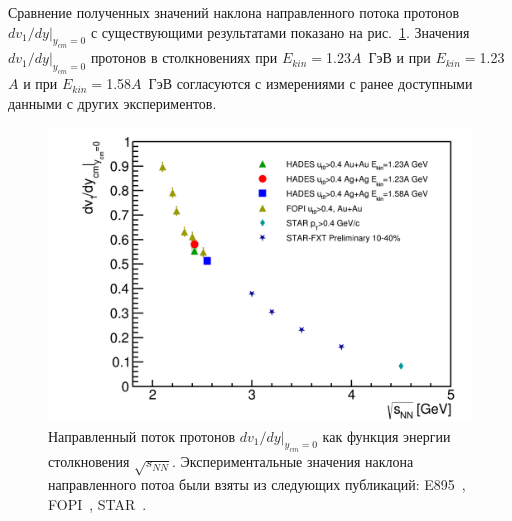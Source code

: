 Сравнение полученных значений наклона направленного потока протонов $dv_1/dy|_{y_{cm}=0}$ с существующими результатами показано на рис.~\ref{fig:hades_dv1_dy_sqrt_snn}.
Значения $dv_1/dy|_{y_{cm}=0}$ протонов в столкновениях \au{} при $E_{kin}=$1.23$A$~ГэВ и \ag{} при $E_{kin}=$1.23$A$ и  при $E_{kin}=$1.58$A$~ГэВ согласуются с измерениями с ранее доступными данными с других экспериментов.
%
\begin{figure}[ht]
\begin{center}
\includegraphics[width=0.9\linewidth]{images/dv1_dy_sqrt_snn.png}
\caption{ 
    Направленный поток протонов $dv_1/dy|_{y_{cm}=0}$ как функция энергии столкновения $\sqrt{s_{NN}}$. Экспериментальные значения наклона направленного потоа были взяты из следующих публикаций: E895~\cite{E895:2000maf}, FOPI~\cite{FOPI:2011aa}, STAR~\cite{STAR:2020dav}.
}
\label{fig:hades_dv1_dy_sqrt_snn}
\end{center}
\end{figure}